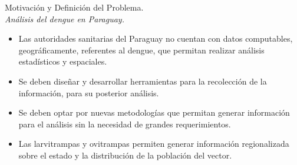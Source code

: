 \begin{frame}[t]{Motivación y Definición del Problema.
\\\textit{Análisis del dengue en Paraguay.}}
  \begin{itemize}

    \item Las autoridades sanitarias del Paraguay no cuentan con datos computables, geográficamente, referentes al dengue, que permitan realizar análisis estadísticos y espaciales.

    \item Se deben diseñar y desarrollar herramientas para la recolección de la información, para
    su posterior análisis.

    \item Se deben optar por nuevas metodologías que permitan generar información para el análisis sin la necesidad de grandes requerimientos.

    \item Las larvitrampas y ovitrampas permiten generar información regionalizada sobre el estado y la distribución de la población del vector.

  \end{itemize}
\end{frame}

